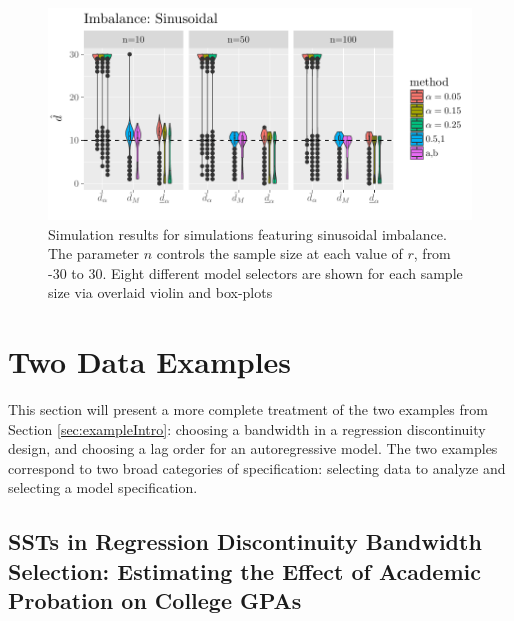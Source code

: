 \documentclass[sts]{imsart}\usepackage[]{graphicx}\usepackage[]{color}
\makeatletter
\def\maxwidth{ %
  \ifdim\Gin@nat@width>\linewidth
    \linewidth
  \else
    \Gin@nat@width
  \fi
}
\makeatother
\begin{document}
\begin{figure}

\includegraphics[width=\maxwidth]{figure/sinusoidalImbalance-1} 

\caption{Simulation results for simulations featuring sinusoidal
  imbalance. The parameter $n$ controls the sample size at each value
  of $r$, from -30 to 30. Eight different model selectors are shown
  for each sample size via overlaid violin and box-plots}
\label{fig:sinImb}
\end{figure}




\section{Two Data Examples}\label{sec:examples}

This section will present a more complete treatment of the two
examples from Section \ref{sec:exampleIntro}: choosing a bandwidth in
a regression discontinuity design, and choosing a lag order for an
autoregressive model.
The two examples correspond to two broad categories of
specification: selecting data to analyze and
selecting a model specification.

\subsection{SSTs in Regression Discontinuity Bandwidth Selection:
  Estimating the Effect of  Academic Probation on College GPAs}
\end{document}
